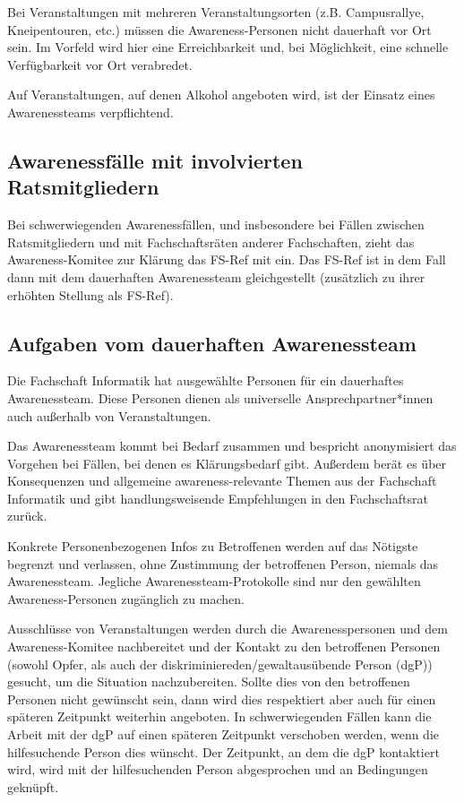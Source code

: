 \documentclass{article}
\begin{document}
Bei Veranstaltungen mit mehreren Veranstaltungsorten (z.B. Campusrallye, Kneipentouren, etc.) müs\-sen die Awareness-Personen nicht dauerhaft vor Ort sein. Im Vorfeld wird 
hier eine Erreichbarkeit und, bei Möglichkeit, eine schnelle Verfügbarkeit vor Ort verabredet.  

Auf Veranstaltungen, auf denen Alkohol angeboten wird, ist der Einsatz eines Awarenessteams verpflichtend.

\subsection{Awarenessfälle mit involvierten Ratsmitgliedern}
Bei schwerwiegenden Awarenessfällen, und insbesondere bei Fällen zwischen Ratsmitgliedern und mit Fachschaftsräten anderer Fachschaften, zieht das Awareness-Komitee zur 
Klärung das FS-Ref mit ein. Das FS-Ref ist in dem Fall dann mit dem dauerhaften Awarenessteam gleichgestellt (zusätzlich zu ihrer erhöhten Stellung als FS-Ref).

\subsection{Aufgaben vom dauerhaften Awarenessteam}
Die Fachschaft Informatik hat ausgewählte Personen für ein dauerhaftes Awarenessteam. Diese Personen dienen als universelle Ansprechpartner*innen auch außerhalb von 
Veranstaltungen.

Das Awarenessteam kommt bei Bedarf zusammen und bespricht anonymisiert das Vorgehen bei Fällen, bei denen es Klärungsbedarf gibt. 
Außerdem berät es über Konsequenzen und allgemeine awareness-relevante Themen aus der Fachschaft Informatik und gibt handlungsweisende Empfehlungen in den Fachschaftsrat zurück.  

Konkrete Personenbezogenen Infos zu Betroffenen werden auf das Nötigste begrenzt und verlassen, ohne Zustimmung der betroffenen Person, niemals das Awarenessteam. Jegliche 
Awarenessteam-Protokol\-le sind nur den gewählten Awareness-Personen zugänglich zu machen.

Ausschlüsse von Veranstaltungen werden durch die Awarenesspersonen und dem Awareness-Komitee nachbereitet und der Kontakt zu den betroffenen Personen (sowohl Opfer, als auch 
der diskriminiereden/gewaltausübende Person (dgP)) gesucht, um die Situation nachzubereiten. Sollte dies von den betroffenen Personen nicht gewünscht sein, dann wird dies 
respektiert aber auch für einen späteren Zeitpunkt weiterhin angeboten. In schwerwiegenden Fällen kann die Arbeit mit der dgP auf einen späteren Zeitpunkt verschoben werden,
wenn die hilfesuchende Person dies wünscht. Der Zeitpunkt, an dem die dgP kontaktiert wird, wird mit der hilfesuchenden Person abgesprochen und an Bedingungen geknüpft.
\end{document}
